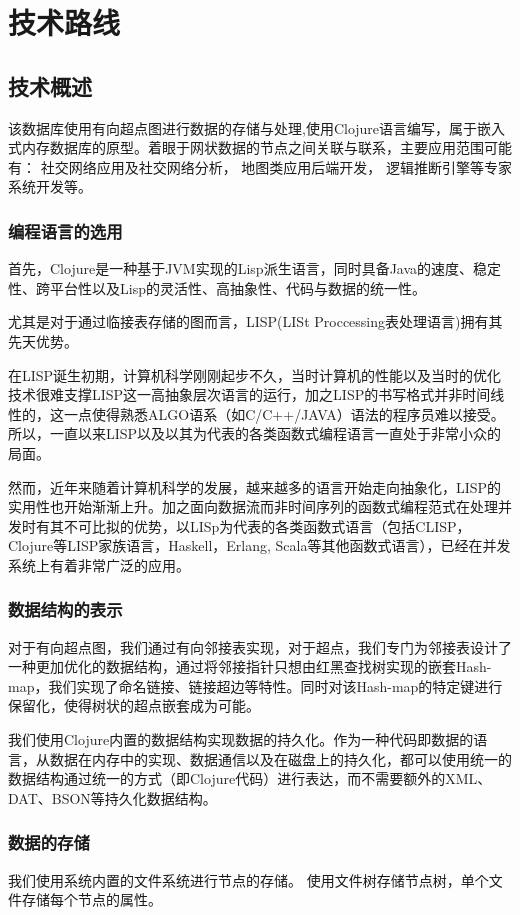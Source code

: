 \documentclass[a4paper]{ecust_thesis_openning}
\begin{document}
\section{技术路线}
	\subsection{技术概述}
		该数据库使用有向超点图进行数据的存储与处理,使用Clojure语言编写，属于嵌入式内存数据库的原型。着眼于网状数据的节点之间关联与联系，主要应用范围可能有： 社交网络应用及社交网络分析， 地图类应用后端开发， 逻辑推断引擎等专家系统开发等。

		\subsubsection{编程语言的选用}
			首先，Clojure是一种基于JVM实现的Lisp派生语言，同时具备Java的速度、稳定性、跨平台性以及Lisp的灵活性、高抽象性、代码与数据的统一性。

			尤其是对于通过临接表存储的图而言，LISP(LISt Proccessing表处理语言)拥有其先天优势。
			
			在LISP诞生初期，计算机科学刚刚起步不久，当时计算机的性能以及当时的优化技术很难支撑LISP这一高抽象层次语言的运行，加之LISP的书写格式并非时间线性的，这一点使得熟悉ALGO语系（如C/C++/JAVA）语法的程序员难以接受。所以，一直以来LISP以及以其为代表的各类函数式编程语言一直处于非常小众的局面。

			然而，近年来随着计算机科学的发展，越来越多的语言开始走向抽象化，LISP的实用性也开始渐渐上升。加之面向数据流而非时间序列的函数式编程范式在处理并发时有其不可比拟的优势，以LISp为代表的各类函数式语言（包括CLISP，Clojure等LISP家族语言，Haskell，Erlang, Scala等其他函数式语言），已经在并发系统上有着非常广泛的应用。

		\subsubsection{数据结构的表示}
			对于有向超点图，我们通过有向邻接表实现，对于超点，我们专门为邻接表设计了一种更加优化的数据结构，通过将邻接指针只想由红黑查找树实现的嵌套Hash-map，我们实现了命名链接、链接超边等特性。同时对该Hash-map的特定键进行保留化，使得树状的超点嵌套成为可能。
			
			我们使用Clojure内置的数据结构实现数据的持久化。作为一种代码即数据的语言，从数据在内存中的实现、数据通信以及在磁盘上的持久化，都可以使用统一的数据结构通过统一的方式（即Clojure代码）进行表达，而不需要额外的XML、DAT、BSON等持久化数据结构。
		\subsubsection{数据的存储}
			我们使用系统内置的文件系统进行节点的存储。 使用文件树存储节点树，单个文件存储每个节点的属性。
			
\end{document}
